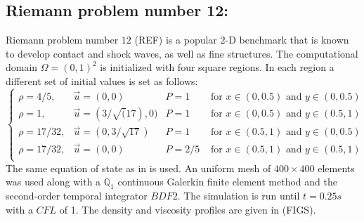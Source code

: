 \subsection{Riemann problem number 12:} \label{sec:2d-riemann-pb-12}
Riemann problem number $12$ (REF) is a popular $2$-D benchmark that is known to develop contact and shock waves, as well as fine structures. The computational domain $\Omega = (0,1)^2$ is initialized with four square regions. In each region a different set of initial values is set as follows:
\begin{equation}
\left\{
\begin{array}{cccc}
\rho = 4/5, & \vec{u} = (0, 0) & P = 1 & \text{ for } x \in (0, 0.5) \text{ and } y \in (0, 0.5) \\
\rho = 1, & \vec{u} = (3/\sqrt(17), 0) & P = 1 & \text{ for } x \in (0, 0.5) \text{ and } y \in (0.5, 1) \\
\rho = 17/32, & \vec{u} = (0,3/\sqrt{17}) & P = 1 & \text{ for } x \in (0.5, 1) \text{ and } y \in (0, 0.5) \\
\rho = 17/32, & \vec{u} = (0, 0) & P = 2/5 & \text{ for } x \in (0.5, 1) \text{ and } y \in (0.5, 1) \\
\end{array}
\right. \nonumber
\end{equation}
The same equation of state as in  is used. An uniform mesh of $400 \times 400 $ elements was used along with a $\mathbb Q_1$ continuous Galerkin finite element method and the second-order temporal integrator $BDF2$. The simulation is run until $t=0.25s$ with a $CFL$ of 1. The density and viscosity profiles are given in (FIGS). 
